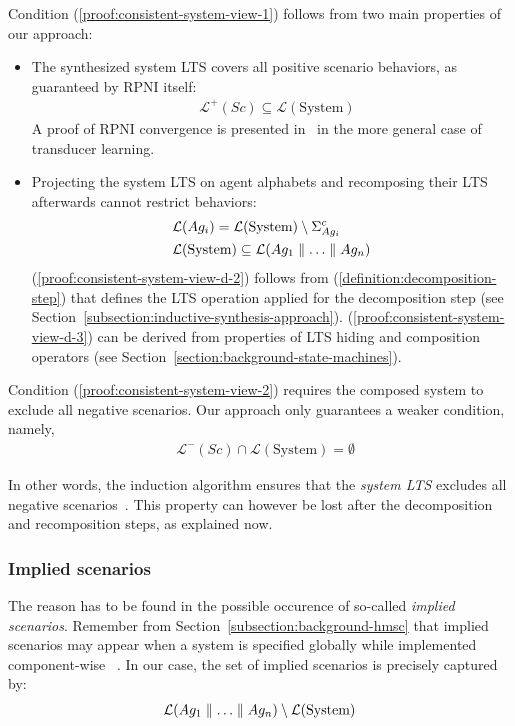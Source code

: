 Condition (\ref{proof:consistent-system-view-1}) follows from two main properties of our approach:
\begin{itemize}
\item The synthesized system LTS covers all positive scenario behaviors, as guaranteed by RPNI itself:
\begin{align}
&\mathcal{L}^+(Sc) \subseteq \mathcal{L}(\mbox{System})\label{proof:consistent-system-view-d-1}
\end{align}
A proof of RPNI convergence is presented in~\cite{Oncina:1993} in the more general case of transducer learning. 
\item Projecting the system LTS on agent alphabets and recomposing their LTS afterwards cannot restrict behaviors:
\begin{align}
&\mathcal{L}(Ag_i) = \mathcal{L}(\mbox{System}) \setminus \Sigma_{Ag_i}^c\label{proof:consistent-system-view-d-2}\\
&\mathcal{L}(\mbox{System}) \subseteq \mathcal{L}(Ag_1 \parallel \ldots \parallel Ag_n)\label{proof:consistent-system-view-d-3}
\end{align}
(\ref{proof:consistent-system-view-d-2}) follows from (\ref{definition:decomposition-step}) that defines the LTS operation applied for the decomposition step (see Section~\ref{subsection:inductive-synthesis-approach}). (\ref{proof:consistent-system-view-d-3}) can be derived from properties of LTS hiding and composition operators (see Section~\ref{section:background-state-machines}).
\end{itemize} 

Condition (\ref{proof:consistent-system-view-2}) requires the composed system to exclude all negative scenarios. Our approach only guarantees a weaker condition, namely,
\begin{align*}
&\mathcal{L}^-(Sc) \cap \mathcal{L}(\mbox{System}) = \emptyset
\end{align*}

In other words, the induction algorithm ensures that the \emph{system LTS} excludes all negative scenarios~\cite{Oncina:1993}. This property can however be lost after the decomposition and recomposition steps, as explained now.

\subsubsection*{Implied scenarios}

The reason has to be found in the possible occurence of so-called \emph{implied scenarios}. Remember from Section~\ref{subsection:background-hmsc} that implied scenarios may appear when a system is specified globally while implemented component-wise ~\cite{Alur:2000, Uchitel:2004}. In our case, the set of implied scenarios is precisely captured by:
\begin{align*}
\mathcal{L}(Ag_1 \parallel \ldots \parallel Ag_n) \setminus \mathcal{L}(\mbox{System})
\end{align*}

